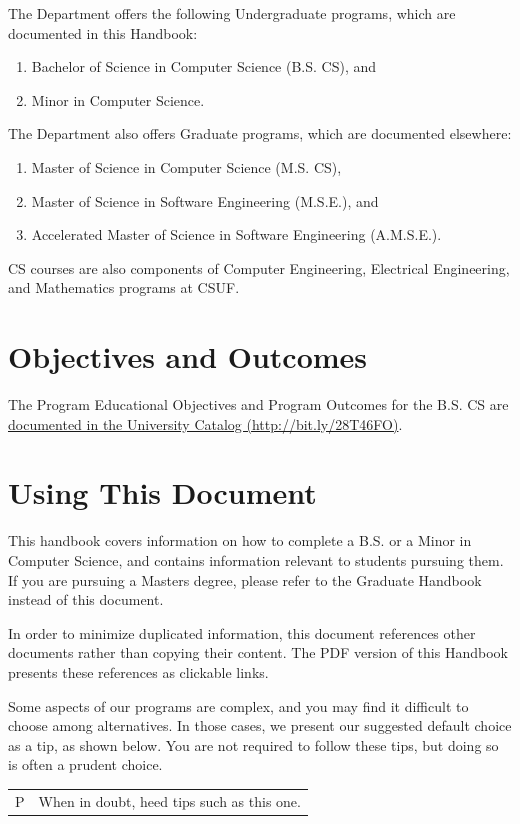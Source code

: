 \documentclass{book}
\newenvironment{tip}{
  \tcolorbox \begin{tabular}{m{.5in} m{5in}} \Large{P} &
}{
  \end{tabular} \endtcolorbox
}
\newcommand{\CampusName}{CSUF}
\begin{document}
The Department offers the following Undergraduate programs, which are documented in this Handbook:
\begin{enumerate}
\item Bachelor of Science in Computer Science (B.S. CS), and
\item Minor in Computer Science.
\end{enumerate}

The Department also offers Graduate programs, which are documented elsewhere:
\begin{enumerate}
\item Master of Science in Computer Science (M.S. CS),
\item Master of Science in Software Engineering (M.S.E.), and
\item Accelerated Master of Science in Software Engineering (A.M.S.E.).
\end{enumerate}

CS courses are also components of Computer Engineering, Electrical Engineering, and Mathematics programs at \CampusName.

\section{Objectives and Outcomes}
 
The Program Educational Objectives and Program Outcomes for the B.S. CS are \href{http://catalog.fullerton.edu/preview_entity.php?catoid=2&ent_oid=113&returnto=137#Learning_Goals_and_Student_Learning_Outcomes}{documented in the University Catalog (\url{http://bit.ly/28T46FO})}.

\section{Using This Document}

This handbook covers information on how to complete a B.S. or a Minor in Computer Science, and contains information relevant to students pursuing them. If you are pursuing a Masters degree, please refer to the Graduate Handbook instead of this document.

In order to minimize duplicated information, this document references other documents rather than copying their content. The PDF version of this Handbook presents these references as clickable links.

Some aspects of our programs are complex, and you may find it difficult to choose among alternatives. In those cases, we present our suggested default choice as a tip, as shown below. You are not required to follow these tips, but doing so is often a prudent choice.
\begin{tip}
When in doubt, heed tips such as this one.
\end{tip}
\end{document}
